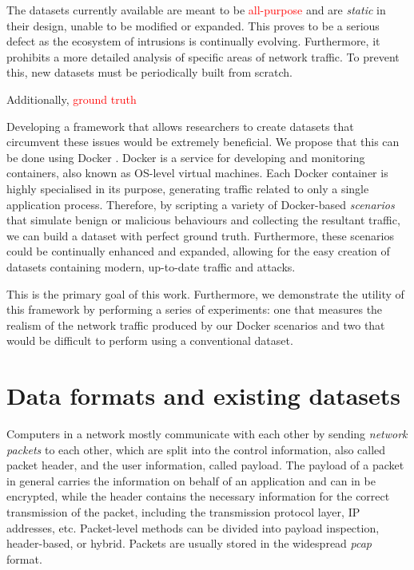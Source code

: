 \documentclass[sigconf,anonymous]{acmart}\usepackage[]{graphicx}\usepackage[]{color}
\begin{document}
The datasets currently available are meant to be \textcolor{red}{all-purpose} and are \textit{static} in their design, unable to be modified or expanded. This proves to be a serious defect as the ecosystem of intrusions is continually evolving. Furthermore, it prohibits a more detailed analysis of specific areas of network traffic. To prevent this, new datasets must be periodically built from scratch.

Additionally, \textcolor{red}{ground truth}

Developing a framework that allows researchers to create datasets that circumvent these issues would be extremely beneficial. We propose that this can be done using Docker \cite{docker}. Docker is a service for developing and monitoring containers, also known as OS-level virtual machines. Each Docker container is highly specialised in its purpose, generating traffic related to only a single application process. Therefore, by scripting a variety of Docker-based \textit{scenarios} that simulate benign or malicious behaviours and collecting the resultant traffic, we can build a dataset with perfect ground truth. Furthermore, these scenarios could be continually enhanced and expanded, allowing for the easy creation of datasets containing modern, up-to-date traffic and attacks. 



This is the primary goal of this work. Furthermore, we demonstrate the utility of this framework by performing a series of experiments: one that measures the realism of the network traffic produced by our Docker scenarios and two that would be difficult to perform using a conventional dataset.

\section{Data formats and existing datasets}

Computers in a network mostly communicate with each other by sending \textit{network packets} to each other, which are split into the control information, also called packet header, and the user information, called payload. The payload of a packet in general carries the information on behalf of an application and can in be encrypted, while the header contains the necessary information for the correct transmission of the packet, including the transmission protocol layer, IP addresses, etc. Packet-level methods can be divided into payload inspection, header-based, or hybrid. Packets are usually stored in the widespread \textit{pcap} format.
\end{document}
